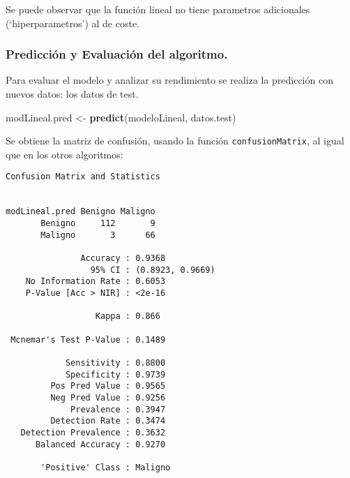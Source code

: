 \documentclass[
]{article}
\newenvironment{Shaded}{\begin{snugshade}}{\end{snugshade}}
\newcommand{\CommentTok}[1]{\textcolor[rgb]{0.56,0.35,0.01}{\textit{#1}}}
\newcommand{\DataTypeTok}[1]{\textcolor[rgb]{0.13,0.29,0.53}{#1}}
\newcommand{\KeywordTok}[1]{\textcolor[rgb]{0.13,0.29,0.53}{\textbf{#1}}}
\newcommand{\NormalTok}[1]{#1}
\newcommand{\OperatorTok}[1]{\textcolor[rgb]{0.81,0.36,0.00}{\textbf{#1}}}
\newcommand{\StringTok}[1]{\textcolor[rgb]{0.31,0.60,0.02}{#1}}
\begin{document}
Se puede observar que la función lineal no tiene parametros adicionales
(`hiperparametros') al de coste.

\hypertarget{predicciuxf3n-y-evaluaciuxf3n-del-algoritmo.}{%
\subsubsection{Predicción y Evaluación del
algoritmo.}\label{predicciuxf3n-y-evaluaciuxf3n-del-algoritmo.}}

Para evaluar el modelo y analizar su rendimiento se realiza la
predicción con nuevos datos: los datos de test.

\begin{Shaded}
\begin{Highlighting}[]
\NormalTok{modLineal.pred <-}\StringTok{ }\KeywordTok{predict}\NormalTok{(modeloLineal, datos.test)}
\end{Highlighting}
\end{Shaded}

Se obtiene la matriz de confusión, usando la función
\texttt{confusionMatrix}, al igual que en los otros algoritmos:

\begin{Shaded}
\end{Shaded}

\begin{verbatim}
Confusion Matrix and Statistics

              
modLineal.pred Benigno Maligno
       Benigno     112       9
       Maligno       3      66
                                          
               Accuracy : 0.9368          
                 95% CI : (0.8923, 0.9669)
    No Information Rate : 0.6053          
    P-Value [Acc > NIR] : <2e-16          
                                          
                  Kappa : 0.866           
                                          
 Mcnemar's Test P-Value : 0.1489          
                                          
            Sensitivity : 0.8800          
            Specificity : 0.9739          
         Pos Pred Value : 0.9565          
         Neg Pred Value : 0.9256          
             Prevalence : 0.3947          
         Detection Rate : 0.3474          
   Detection Prevalence : 0.3632          
      Balanced Accuracy : 0.9270          
                                          
       'Positive' Class : Maligno         
                                          
\end{verbatim}
\end{document}

